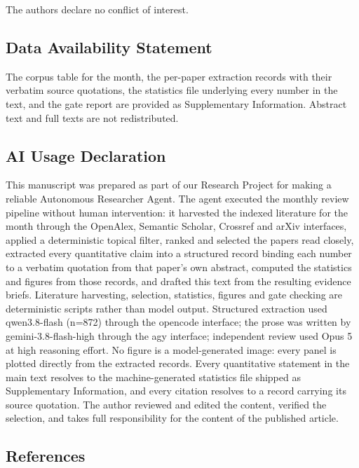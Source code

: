 \documentclass[
  11pt,
]{article}
\begin{document}
The authors declare no conflict of interest.

\subsection{Data Availability
Statement}\label{data-availability-statement}

The corpus table for the month, the per-paper extraction records with
their verbatim source quotations, the statistics file underlying every
number in the text, and the gate report are provided as Supplementary
Information. Abstract text and full texts are not redistributed.

\subsection{AI Usage Declaration}\label{ai-usage-declaration}

This manuscript was prepared as part of our Research Project for making
a reliable Autonomous Researcher Agent. The agent executed the monthly
review pipeline without human intervention: it harvested the indexed
literature for the month through the OpenAlex, Semantic Scholar,
Crossref and arXiv interfaces, applied a deterministic topical filter,
ranked and selected the papers read closely, extracted every
quantitative claim into a structured record binding each number to a
verbatim quotation from that paper's own abstract, computed the
statistics and figures from those records, and drafted this text from
the resulting evidence briefs. Literature harvesting, selection,
statistics, figures and gate checking are deterministic scripts rather
than model output. Structured extraction used qwen3.8-flash (n=872)
through the opencode interface; the prose was written by
gemini-3.8-flash-high through the agy interface; independent review used
Opus 5 at high reasoning effort. No figure is a model-generated image:
every panel is plotted directly from the extracted records. Every
quantitative statement in the main text resolves to the
machine-generated statistics file shipped as Supplementary Information,
and every citation resolves to a record carrying its source quotation.
The author reviewed and edited the content, verified the selection, and
takes full responsibility for the content of the published article.

\subsection{References}\label{references}
\end{document}
